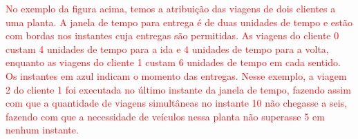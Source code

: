    \textcolor{red}{No exemplo da figura acima, temos a atribuição das viagens de dois clientes a uma planta. A janela de tempo para entrega é de duas unidades de tempo e estão com bordas nos instantes cuja entregas são permitidas. As viagens do cliente 0 custam 4 unidades de tempo para a ida e 4 unidades de tempo para a volta, enquanto as viagens do cliente 1 custam 6 unidades de tempo em cada sentido. Os instantes em azul indicam o momento das entregas.
  Nesse exemplo, a viagem 2 do cliente 1 foi executada no último instante da janela de tempo, fazendo assim com que a quantidade de viagens simultâneas no instante 10 não chegasse a seis, fazendo com que a necessidade de veículos nessa planta não superasse 5 em nenhum instante. }
  